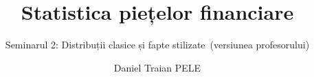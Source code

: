 \title[Statistica piețelor financiare]{Statistica piețelor financiare}
\subtitle{Seminarul 2: Distribuții clasice și fapte stilizate\ifsolutions\ (versiunea profesorului)\fi}
\author[D.T. Pele]{Daniel Traian PELE}
\date{}

\providecommand{\sfmapplink}[3]{\hypertarget{#2}{}\hyperlink{#1}{\beamergotobutton{#3}}}  %
\providecommand{\sfmappback}[2]{\begin{tikzpicture}[remember picture,overlay]\node[anchor=south east] at ([xshift=-3mm,yshift=7mm]current page.south east){\hyperlink{#1}{\beamerreturnbutton{#2}}};\end{tikzpicture}}  %
\providecommand{\sfmchlink}[2]{\href{#1}{#2}}  %
\providecommand{\sfmchlinkt}[2]{\href{#1}{\usebeamercolor[fg]{frametitle}#2}}  %


